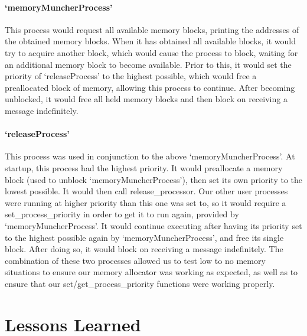 \documentclass[12pt]{report}
\begin{document}
\subsection{`memoryMuncherProcess'}

    This process would request all available memory blocks, printing the
    addresses of the obtained memory blocks.  When it has obtained all available
    blocks, it would try to acquire another block, which would cause the process
    to block, waiting for an additional memory block to become available.  Prior
    to this, it would set the priority of `releaseProcess' to the highest
    possible, which would free a preallocated block of memory, allowing this
    process to continue.  After becoming unblocked, it would free all held
    memory blocks and then block on receiving a message indefinitely.

\subsection{`releaseProcess'}

    This process was used in conjunction to the above `memoryMuncherProcess'.
    At startup, this process had the highest priority.  It would preallocate a
    memory block (used to unblock `memoryMuncherProcess'), then set its own
    priority to the lowest possible.  It would then call release\_processor.
    Our other user processes were running at higher priority than this one was
    set to, so it would require a set\_process\_priority in order to get it to
    run again, provided by `memoryMuncherProcess'.  It would continue executing
    after having its priority set to the highest possible again by
    `memoryMuncherProcess', and free its single block.  After doing so, it would
    block on receiving a message indefinitely.  The combination of these two
    processes allowed us to test low to no memory situations to ensure our
    memory allocator was working as expected, as well as to ensure that our
    set/get\_process\_priority functions were working properly.

\part{Lessons Learned}
\end{document}
